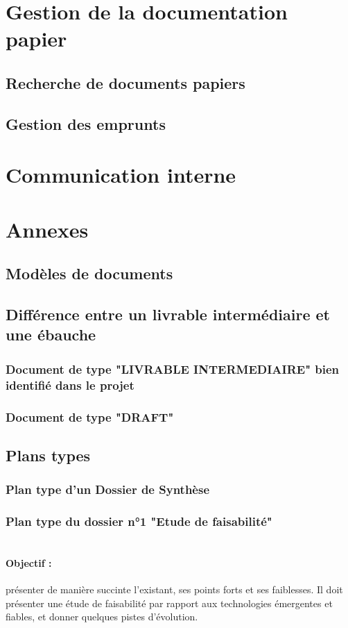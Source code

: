 \section{Gestion de la documentation papier}
  \subsection{Recherche de documents papiers}
  \subsection{Gestion des emprunts}
\section{Communication interne}
\section{Annexes}
  \subsection{Modèles de documents}
  \subsection{Différence entre un livrable intermédiaire et une ébauche}     
    \subsubsection{Document de type "LIVRABLE INTERMEDIAIRE" bien identifié dans le projet}
    \subsubsection{Document de type "DRAFT"}
  \subsection{Plans types}     
    \subsubsection{Plan type d'un Dossier de Synthèse}
    
    \subsubsection{Plan type du dossier n°1 "Etude de faisabilité"}
      \paragraph*{\\Objectif :}
        présenter de manière succinte l'existant, ses points forts et ses faiblesses. Il doit
        présenter une étude de faisabilité par rapport aux technologies émergentes et fiables, et donner quelques pistes d'évolution.
